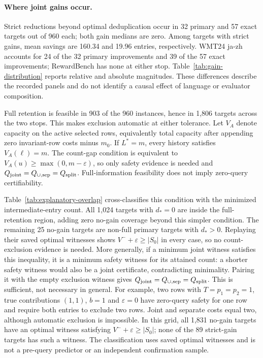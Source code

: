 


\paragraph{Where joint gains occur.}
\label{app:joint-mechanism}
Strict reductions beyond optimal deduplication occur in 32 primary and 57 exact targets out of 960 each; both gain medians are zero. Among targets with strict gains, mean savings are 160.34 and 19.96 entries, respectively. WMT24 ja-zh accounts for 24 of the 32 primary improvements and 39 of the 57 exact improvements; RewardBench has none at either stop. Table~\ref{tab:gain-distribution} reports relative and absolute magnitudes. These differences describe the recorded panels and do not identify a causal effect of language or evaluator composition.


Full retention is feasible in 903 of the 960 instances, hence in 1,806 targets across the two stops. This makes exclusion automatic at either tolerance. Let $V_A$ denote capacity on the active selected rows, equivalently total capacity after appending zero invariant-row costs minus $m_0$. If $L^*=m$, every history satisfies $V_A(\ell)=m$. The count-gap condition is equivalent to $V_A(u)\ge\max(0,m-\varepsilon)$, so only safety evidence is needed and $Q_{\rm joint}=Q_{\cup,\rm sep}=Q_{\rm split}$. Full-information feasibility does not imply zero-query certifiability.

Table~\ref{tab:explanatory-overlap} cross-classifies this condition with the minimized intermediate-entry count. All 1,024 targets with $d_*=0$ are inside the full-retention region, adding zero no-gain coverage beyond this simpler condition. The remaining 25 no-gain targets are non-full primary targets with $d_*>0$. Replaying their saved optimal witnesses shows $V^-+\varepsilon\ge |S_0|$ in every case, so no count-exclusion evidence is needed. More generally, if a minimum joint witness satisfies this inequality, it is a minimum safety witness for its attained count: a shorter safety witness would also be a joint certificate, contradicting minimality. Pairing it with the empty exclusion witness gives $Q_{\rm joint}=Q_{\cup,\rm sep}=Q_{\rm split}$. This is sufficient, not necessary in general. For example, two rows with $T=p_1=p_2=1$, true contributions $(1,1)$, $b=1$ and $\varepsilon=0$ have zero-query safety for one row and require both entries to exclude two rows. Joint and separate costs equal two, although automatic exclusion is impossible. In this grid, all 1,831 no-gain targets have an optimal witness satisfying $V^-+\varepsilon\ge|S_0|$; none of the 89 strict-gain targets has such a witness. The classification uses saved optimal witnesses and is not a pre-query predictor or an independent confirmation sample.

